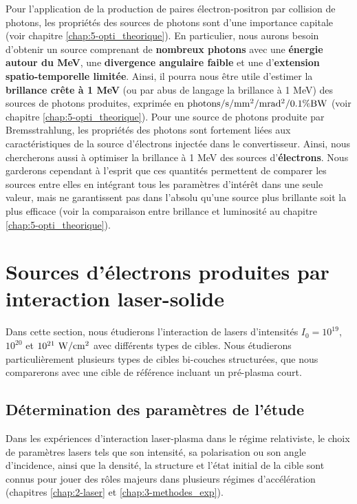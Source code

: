 \begin{refsection}
Pour l'application de la production de paires électron-positron par collision de photons, les propriétés des sources de photons sont d'une importance capitale (voir chapitre \ref{chap:5-opti_theorique}). En particulier, nous aurons besoin d'obtenir un source comprenant de \textbf{nombreux photons} avec une \textbf{énergie autour du MeV}, une \textbf{divergence angulaire faible} et une d'\textbf{extension spatio-temporelle limitée}. Ainsi, il pourra nous être utile d'estimer la \textbf{brillance crête à 1 MeV} (ou par abus de langage la brillance à 1 MeV) des sources de photons produites, exprimée en $\rm photons/s/mm^2/mrad^2/0.1\%BW$ (voir chapitre \ref{chap:5-opti_theorique}). 
Pour une source de photons produite par Bremsstrahlung, les propriétés des photons sont fortement liées aux caractéristiques de la source d'électrons injectée dans le convertisseur. Ainsi, nous chercherons aussi à optimiser la brillance à 1 MeV des sources d'\textbf{électrons}. Nous garderons cependant à l'esprit que ces quantités permettent de comparer les sources entre elles en intégrant tous les paramètres d'intérêt dans une seule valeur, mais ne garantissent pas dans l'absolu qu'une source plus brillante soit la plus efficace (voir la comparaison entre brillance et luminosité au chapitre \ref{chap:5-opti_theorique}).

\section{Sources d'électrons produites par interaction laser-solide}

Dans cette section, nous étudierons l'interaction de lasers d'intensités $I_0=10^{19}$, $10^{20}$ et $10^{21} ~ \rm W/cm^2$ avec différents types de cibles. Nous étudierons particulièrement plusieurs types de cibles bi-couches structurées, que nous comparerons avec une cible de référence incluant un pré-plasma court.

\subsection{Détermination des paramètres de l'étude}

Dans les expériences d'interaction laser-plasma dans le régime relativiste, le choix de paramètres lasers tels que son intensité, sa polarisation ou son angle d'incidence, ainsi que la densité, la structure et l'état initial de la cible sont connus pour jouer des rôles majeurs dans plusieurs régimes d'accélération (chapitres \ref{chap:2-laser} et \ref{chap:3-methodes_exp}). 


\end{refsection}
